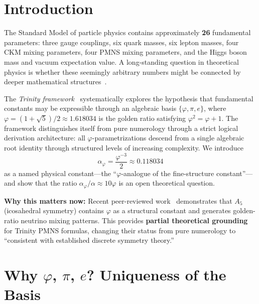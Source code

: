 \documentclass[10pt,a4paper]{article}
\begin{document}
\section*{Introduction}

The Standard Model of particle physics contains approximately \textbf{26} fundamental parameters:
three gauge couplings, six quark masses, six lepton masses, four CKM mixing parameters, four PMNS
mixing parameters, and the Higgs boson mass and vacuum expectation value. A long-standing question
in theoretical physics is whether these seemingly arbitrary numbers might be connected by deeper
mathematical structures~\cite{PDG2024}.

The \textit{Trinity framework}~\cite{trinity2024} systematically explores the hypothesis that
fundamental constants may be expressible through an algebraic basis $\{\varphi, \pi, e\}$, where
$\varphi = (1+\sqrt{5})/2 \approx 1.618034$ is the golden ratio satisfying $\varphi^2 = \varphi + 1$.
The framework distinguishes itself from pure numerology through a strict logical derivation
architecture: all $\varphi$-parametrizations descend from a single algebraic root identity through
structured levels of increasing complexity. We introduce
\[
  \alpha_\varphi = \frac{\varphi^{-3}}{2} \approx 0.118034
\]
as a named physical constant---the ``$\varphi$-analogue of the fine-structure constant''---and show that
the ratio $\alpha_\varphi/\alpha \approx 10\varphi$ is an open theoretical question.

\medskip
\noindent\textbf{Why this matters now:}
Recent peer-reviewed work~\cite{PLB2025} demonstrates that $A_5$ (icosahedral symmetry)
contains $\varphi$ as a structural constant and generates golden-ratio neutrino mixing patterns.
This provides \textbf{partial theoretical grounding} for Trinity PMNS formulas, changing their
status from pure numerology to ``consistent with established discrete symmetry theory.''

\medskip

\section*{Why $\varphi$, $\pi$, $e$? Uniqueness of the Basis}
\end{document}
